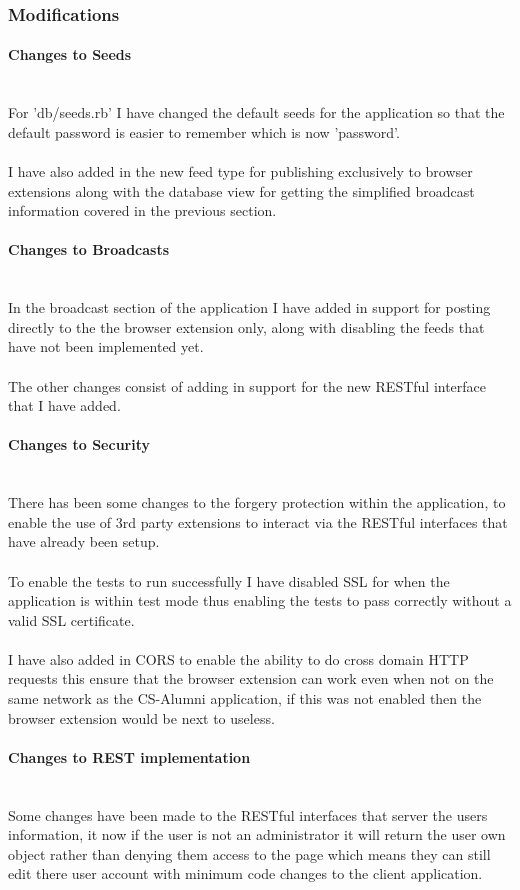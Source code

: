 \documentclass{article}
\newcommand{\myparagraph}[1]{\paragraph{#1}\mbox{}\\}
\begin{document}
\subsubsection{Modifications}

\myparagraph{Changes to Seeds}

For 'db/seeds.rb' I have changed the default seeds for the application so that the default password is easier to remember which is now 'password'.\\
\\
I have also added in the new feed type for publishing exclusively to browser extensions along with the database view for getting the simplified broadcast information covered in the previous section.

\myparagraph{Changes to Broadcasts}

In the broadcast section of the application I have added in support for posting directly to the the browser extension only, along with disabling the feeds that have not been implemented yet.\\
\\
The other changes consist of adding in support for the new RESTful interface that I have added.

\myparagraph{Changes to Security}

There has been some changes to the forgery protection within the application, to enable the use of 3rd party extensions to interact via the RESTful interfaces that have already been setup.\\
\\
To enable the tests to run successfully I have disabled SSL for when the application is within test mode thus enabling the tests to pass correctly without a valid SSL certificate.\\
\\
I have also added in CORS to enable the ability to do cross domain HTTP requests this ensure that the browser extension can work even when not on the same network as the CS-Alumni application, if this was not enabled then the browser extension would be next to useless.

\myparagraph{Changes to REST implementation}

Some changes have been made to the RESTful interfaces that server the users information, it now if the user is not an administrator it will return the user own object rather than denying them access to the page which means they can still edit there user account with minimum code changes to the client application. 
\end{document}
